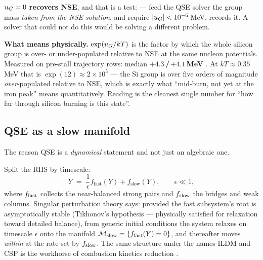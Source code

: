 \textbf{$u_{G} = 0$ recovers NSE}, and that is a test:
 --- feed the QSE
solver the group mass \emph{taken from the NSE solution}, and require
$|u_{G}| < 10^{-6}$\,MeV.  records it. A solver that could
not do this would be solving a different problem.

\begin{result}
\textbf{What \uG{} means physically.} $\exp(u_{G}/kT)$ is the factor by which the
whole silicon group is over- or under-populated relative to NSE at the same
nucleon potentials. Measured on pre-stall trajectory rows: median
\textbf{$+4.3$\,/\,$+4.1$\,MeV} . At
$kT \approx 0.35$\,MeV that is $\exp(12) \approx 2\times10^{5}$ --- the Si group
is over five orders of magnitude \emph{over}-populated relative to NSE, which is
exactly what ``mid-burn, not yet at the iron peak'' means quantitatively.
Reading \uG{} is the cleanest single number for ``how far through silicon
burning is this state''.
\end{result}

\subsection{QSE as a slow manifold}
\label{sec:slowmanifold}

The reason QSE is a \emph{dynamical} statement and not just an algebraic one.

Split the RHS by timescale:
%
\begin{equation}
\dot Y \;=\; \frac{1}{\epsilon}f_{\mathrm{fast}}(Y) + f_{\mathrm{slow}}(Y),
\qquad \epsilon \ll 1,
\label{eq:timescalesplit}
\end{equation}
%
where $f_{\rm fast}$ collects the near-balanced strong pairs and $f_{\rm slow}$
the bridges and weak columns. Singular perturbation theory
\citep[geometric form][]{tikhonov1952, fenichel1979} says: provided the fast
subsystem's root is asymptotically stable (Tikhonov's hypothesis --- physically
satisfied for relaxation toward detailed balance), from generic initial
conditions the system relaxes on timescale $\epsilon$ onto the manifold
$\mathcal{M}_{\mathrm{slow}} = \{f_{\rm fast}(Y) = 0\}$, and thereafter moves \emph{within} \Mslow{}
at the rate set by $f_{\rm slow}$. The same structure under the names ILDM and
CSP is the workhorse of combustion kinetics reduction \citep{maas1992, lam1994}.

